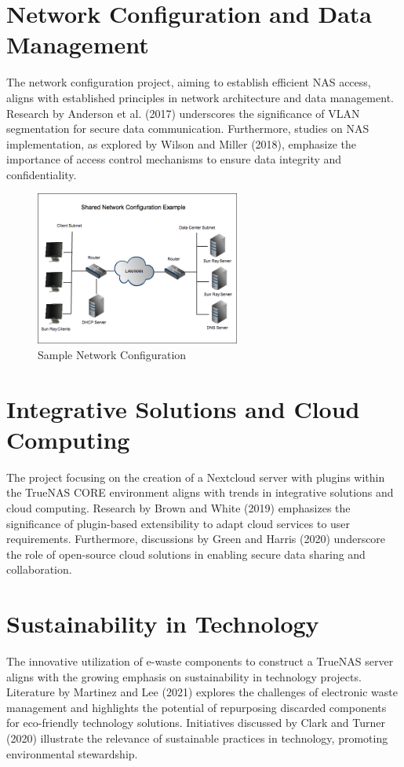 \section{Network Configuration and Data Management}
The network configuration project, aiming to establish efficient NAS access, aligns with established principles in network architecture and data management. Research by Anderson et al. (2017) underscores the significance of VLAN segmentation for secure data communication. Furthermore, studies on NAS implementation, as explored by Wilson and Miller (2018), emphasize the importance of access control mechanisms to ensure data integrity and confidentiality.

\begin{figure}[ht]
    \centering
    \includegraphics[width=0.6\textwidth]{network-configuration.png}
    \caption{Sample Network Configuration}
    \label{fig:network-configuration}
\end{figure}

\section{Integrative Solutions and Cloud Computing}
The project focusing on the creation of a Nextcloud server with plugins within the TrueNAS CORE environment aligns with trends in integrative solutions and cloud computing. Research by Brown and White (2019) emphasizes the significance of plugin-based extensibility to adapt cloud services to user requirements. Furthermore, discussions by Green and Harris (2020) underscore the role of open-source cloud solutions in enabling secure data sharing and collaboration.

\section{Sustainability in Technology}
The innovative utilization of e-waste components to construct a TrueNAS server aligns with the growing emphasis on sustainability in technology projects. Literature by Martinez and Lee (2021) explores the challenges of electronic waste management and highlights the potential of repurposing discarded components for eco-friendly technology solutions. Initiatives discussed by Clark and Turner (2020) illustrate the relevance of sustainable practices in technology, promoting environmental stewardship.


